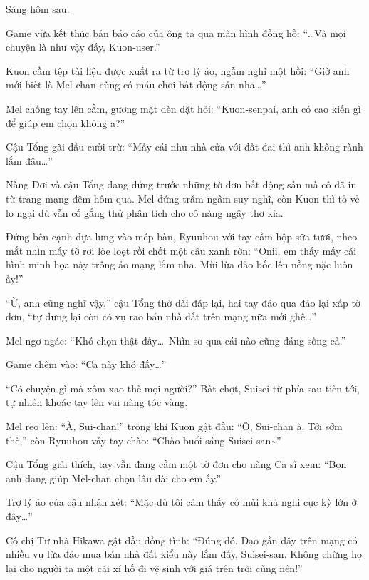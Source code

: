 \documentclass[../main.tex]{subfiles}
\begin{document}
\begin{center}
  \uline{Sáng hôm sau.}
\end{center}

Game vừa kết thúc bản báo cáo của ông ta qua màn hình đồng hồ: ``\dots Và mọi chuyện là như vậy đấy, Kuon-user.''

Kuon cầm tệp tài liệu được xuất ra từ trợ lý ảo, ngẫm nghĩ một hồi: ``Giờ anh mới biết là Mel-chan cũng có máu chơi bất động sản nha\dots''

Mel chống tay lên cằm, gương mặt dèn dặt hỏi: ``Kuon-senpai, anh có cao kiến gì để giúp em chọn không ạ?''

Cậu Tổng gãi đầu cười trừ: ``Mấy cái như nhà cửa với đất đai thì anh không rành lắm đâu\dots''

Nàng Dơi và cậu Tổng đang đứng trước những tờ đơn bất động sản mà cô đã in từ trang mạng đêm hôm qua. Mel đứng trầm ngâm suy nghĩ, còn Kuon thì tỏ vẻ lo ngại dù vẫn cố gắng thử phân tích cho cô nàng ngây thơ kia.


Đứng bên cạnh dựa lưng vào mép bàn, Ryuuhou với tay cầm hộp sữa tươi, nheo mắt nhìn mấy tờ rơi lòe loẹt rồi chốt một câu xanh rờn: ``Onii, em thấy mấy cái hình minh họa này trông ảo mạng lắm nha. Mùi lừa đảo bốc lên nồng nặc luôn ấy!''

``Ừ, anh cũng nghĩ vậy,'' cậu Tổng thở dài đáp lại, hai tay đảo qua đảo lại xấp tờ đơn, ``tự dưng lại còn có vụ rao bán nhà đất trên mạng nữa mới ghê\dots''

Mel ngơ ngác: ``Khó chọn thật đấy\dots\ Nhìn sơ qua cái nào cũng đáng sống cả.''

Game chêm vào: ``Ca này khó đấy\dots''

``Có chuyện gì mà xôm xao thế mọi người?'' Bất chợt,  Suisei từ phía sau tiến tới, tự nhiên khoác tay lên vai nàng tóc vàng.

Mel reo lên: ``À, Sui-chan!'' trong khi Kuon gật đầu: ``Ô, Sui-chan à. Tới sớm thế,'' còn Ryuuhou vẫy tay chào: ``Chào buổi sáng Suisei-san\~{}''

Cậu Tổng giải thích, tay vẫn đang cầm một tờ đơn cho nàng Ca sĩ xem: ``Bọn anh đang giúp Mel-chan chọn lâu đài cho em ấy.''

Trợ lý ảo của cậu nhận xét: ``Mặc dù tôi cảm thấy có mùi khả nghi cực kỳ lớn ở đây\dots''

Cô chị Tư nhà Hikawa gật đầu đồng tình: ``Đúng đó. Dạo gần đây trên mạng có nhiều vụ lừa đảo mua bán nhà đất kiểu này lắm đấy, Suisei-san. Không chừng họ lại cho người ta một cái xí hố đi vệ sinh với giá trên trời cũng nên!''
\end{document}
